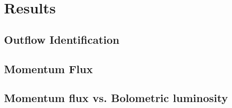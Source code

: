 \section{Results}


\subsection{Outflow Identification}



\subsection{Momentum Flux}



\subsection{Momentum flux vs. Bolometric luminosity}

